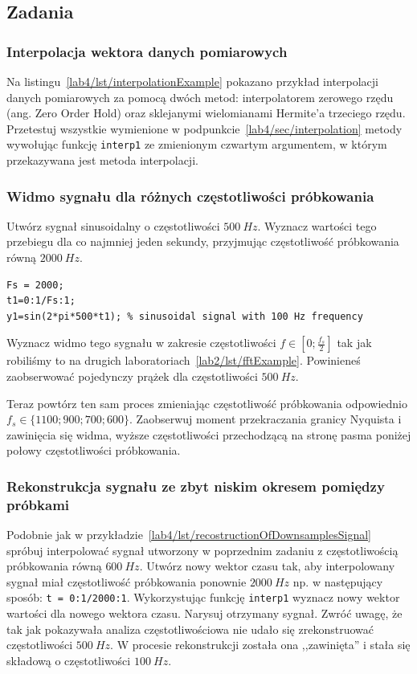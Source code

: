 \subsection{Zadania}
\subsubsection{Interpolacja wektora danych pomiarowych}
Na listingu~\ref{lab4/lst/interpolationExample} pokazano przykład interpolacji danych pomiarowych za pomocą dwóch metod: interpolatorem zerowego rzędu (ang. Zero Order Hold) oraz sklejanymi wielomianami Hermite'a trzeciego rzędu. Przetestuj wszystkie wymienione w podpunkcie~\ref{lab4/sec/interpolation} metody wywołując funkcję \texttt{interp1} ze zmienionym czwartym argumentem, w którym przekazywana jest metoda interpolacji.
\subsubsection{Widmo sygnału dla różnych częstotliwości próbkowania}
Utwórz sygnał sinusoidalny o częstotliwości $500~Hz$. Wyznacz wartości tego przebiegu dla co najmniej jeden sekundy, przyjmując częstotliwość próbkowania równą $2000~Hz$.
\begin{lstlisting}[caption=Symulacja niedostatecznie wysokiej częstotliwości próbkowania, label=lab4/lst/recostructionOfDownsamplesSignal]
Fs = 2000;
t1=0:1/Fs:1;
y1=sin(2*pi*500*t1); % sinusoidal signal with 100 Hz frequency
\end{lstlisting}
Wyznacz widmo tego sygnału w zakresie częstotliwości $f\in[0;\frac{f_s}{2}]$ tak jak robiliśmy to na drugich laboratoriach~\ref{lab2/lst/fftExample}. Powinieneś zaobserwować pojedynczy prążek dla częstotliwości $500~Hz$.

Teraz powtórz ten sam proces zmieniając częstotliwość próbkowania odpowiednio $f_s \in \{1100; 900; 700; 600\}$. Zaobserwuj moment przekraczania granicy Nyquista i zawinięcia się widma, wyższe częstotliwości przechodzącą na stronę pasma poniżej połowy częstotliwości próbkowania.


\subsubsection{Rekonstrukcja sygnału ze zbyt niskim okresem pomiędzy próbkami}
Podobnie jak w przykładzie~\ref{lab4/lst/recostructionOfDownsamplesSignal} spróbuj interpolować sygnał utworzony w poprzednim zadaniu z częstotliwością próbkowania równą $600~Hz$. Utwórz nowy wektor czasu tak, aby interpolowany sygnał miał częstotliwość próbkowania ponownie $2000~Hz$ np. w następujący sposób: \texttt{t = 0:1/2000:1}. Wykorzystując funkcję \texttt{interp1} wyznacz nowy wektor wartości dla nowego wektora czasu. Narysuj otrzymany sygnał. Zwróć uwagę, że tak jak pokazywała analiza częstotliwościowa nie udało się zrekonstruować częstotliwości $500~Hz$. W procesie rekonstrukcji została ona ,,zawinięta'' i stała się składową o częstotliwości $100~Hz$.